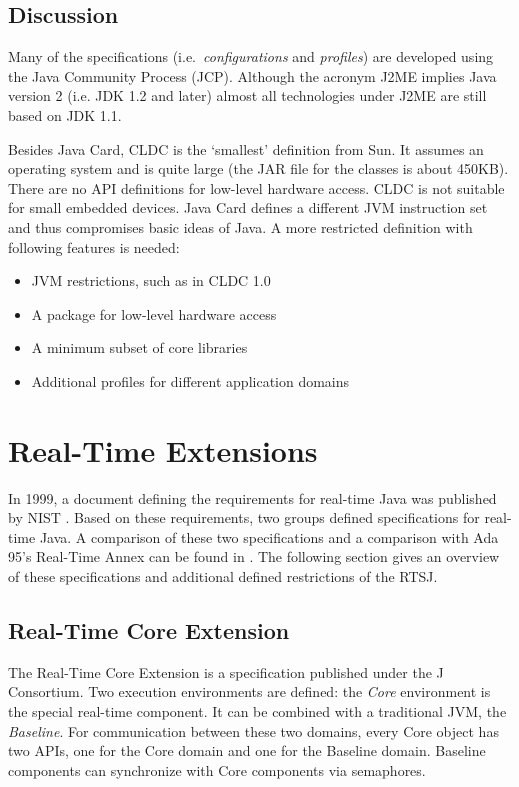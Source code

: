 \subsection{Discussion}

Many of the specifications (i.e.\ \textit{configurations} and
\textit{profiles}) are developed using the Java Community Process
(JCP). Although the acronym J2ME implies Java version 2 (i.e. JDK
1.2 and later) almost all technologies under J2ME are still based on
JDK 1.1.

Besides Java Card, CLDC is the `smallest' definition from Sun. It
assumes an operating system and is quite large (the JAR file for the
classes is about 450KB). There are no API definitions for low-level
hardware access. CLDC is not suitable for small embedded devices.
Java Card defines a different JVM instruction set and thus
compromises basic ideas of Java. A more restricted definition with
following features is needed:
%
\begin{itemize}
    \item JVM restrictions, such as in CLDC 1.0
    \item A package for low-level hardware access
    \item A minimum subset of core libraries
    \item Additional profiles for different application domains
\end{itemize}


\section{Real-Time Extensions}

In 1999, a document defining the requirements for real-time Java was
published by NIST \cite{nist99}. Based on these requirements, two
groups defined specifications for real-time Java. A comparison of
these two specifications and a comparison with Ada 95's Real-Time
Annex can be found in \cite{507579}. The following section gives an
overview of these specifications and additional defined restrictions
of the RTSJ.

\subsection{Real-Time Core Extension}

The Real-Time Core Extension \cite{JCons00} is a specification
published under the J Consortium. Two execution environments are
defined: the \textit{Core} environment is the special real-time
component. It can be combined with a traditional JVM, the
\textit{Baseline}. For communication between these two domains,
every Core object has two APIs, one for the Core domain and one for
the Baseline domain. Baseline components can synchronize with Core
components via semaphores.

